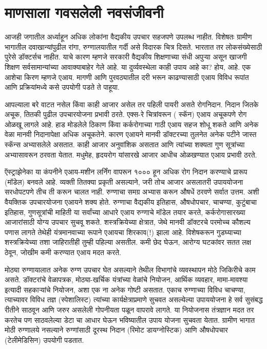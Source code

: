 \chapter{माणसाला गवसलेली नवसंजीवनी}

आजही जगातील अर्ध्याहून अधिक लोकांना वैद्यकीय उपचार सहजपणे उपलब्ध नाहीत. विशेषतः ग्रामीण भागातील दवाखान्यांपुढील रांगा, रुग्णालयातील गर्दी असे विदारक चित्र दिसते. भारतात तर लोकसंख्येसाठी पुरेसे डॉक्टर्सच नाहीत. याचे कारण म्हणजे सरकारी वैद्यकीय शिक्षणाच्या संधी अपुऱ्या असून खाजगी शिक्षण सर्वसामान्यांच्या आवाक्याबाहेर गेले आहे. या दुर्व्यवस्थेला काही उपाय आहे का? होय, आहे. एक आशेचा किरण म्हणजे एआय. मागणी आणि पुरवठ्यातील दरी भरून काढण्यासाठी एआय विविध रूपांत आणि प्रक्रियांमध्ये कसे उपयोगी पडते ते पाहूया.

आपल्याला बरे वाटत नसेल किंवा काही आजार असेल तर पहिली पायरी असते रोगनिदान. निदान जितके अचूक, तितकी पुढील उपचारयोजना प्रभावी ठरते. एक्स-रे चित्रांवरून ( स्कॅन) एआय अचूकपणे रोग ओळखू लागले आहे. हाड मोडलेले ठिकाण किंवा कर्करोगाच्या गाठी एआय सहज शोधू शकते आणि अनेक वेळा मानवी निदानापेक्षा अधिक अचूकतेने. कारण एआयने मानवी डॉक्टरच्या तुलनेत अनेक पटीने जास्त स्कॅन्स अभ्यासलेले असतात. काही आजार अनुवांशिक असतात आणि त्यांच्या शक्यता गुण सूत्रांच्या अभ्यासावरून ठरवता येतात.  मधुमेह, हृदयरोग यांसारखे आजार आधीच ओळखण्यात एआय प्रभावी ठरते. 

ऍस्ट्राझेनेका या कंपनीने एआय-मशीन लर्निंग वापरून १००० हून अधिक रोग निदान करण्याचे प्रारूप (मॉडेल) बनवले आहे. व्यक्ती तितक्या प्रकृती असल्याने, जरी तोच आजार असलातरी उपाययोजना सरधोपटपणे तीच ती करून चालत नाही. रुग्णाचा समग्र अभ्यास करून औषधें ठरवणे सर्वात उत्तम. अशी वैयक्तिक उपचारयोजना एआयने शक्य होते. रुग्णाचा वैद्यकीय इतिहास, औषधोपचार, चाचण्या, कुटुंबाचा इतिहास, गुणसूत्रांची माहिती या सर्वांच्या आधारे एआय रुग्णाचे मॉडेल तयार करते,  कर्करोगासारख्या आजारांसाठी योग्य उपचार सुचवू शकते.  शस्त्रक्रियेच्या क्षेत्रात, जेथे मानवी डॉक्टरचे परमोच्च कौशल्य पणास लागते तेथेही यंत्रमानवाच्या रूपाने एआयचा शिरकाव(!) झाला आहे. विशेषकरून गुडघ्याच्या शस्त्रक्रियेच्या तशा जाहिरातीही तुम्ही पहिल्या असतील. कमी छेद घेऊन, आरोग्य घटकांवर सतत लक्ष ठेवून, जोखीम कमी करण्यात एआय मदत करते.

मोठ्या रुग्णायालात अनेक रुग्ण उपचार घेत असल्याने तेथील विभागांचे व्यवस्थापन मोठे जिकिरीचे काम असते. डॉक्टरांचे वेळापत्रक, मोठ्या-खर्चिक यंत्रांच्या वेळांचे नियोजन, आर्थिक व्यवहार, मामा-मावश्या इत्यादी सहकाऱ्यांचे नियोजन, अशा एक ना अनेक गोष्टी असतात. एकाच रुग्णाच्या विविध चाचण्या, त्याच्यावर विविध तज्ञ (स्पेशालिस्ट) त्यांच्या कार्यक्षेत्राप्रमाणे सुचवत असल्येल्या उपाययोजना हे सर्व सुसंबद्ध रीतीने साठवून आणि जरुर असलेली गोपनीयता पळून वापरावे लागते. या नियोजनास तंत्रज्ञान मदत तर करतेच पण साठवलेल्या डेटा चा आधार घेऊन भविष्यातील उपाय योजना सुचवता येतात. ग्रामीण भागात मोठी रुग्णालये नसल्याने रुग्णांसाठी दूरस्थ निदान (रिमोट डायग्नोस्टिक) आणि औषधोपचार (टेलीमेडिसिन) उपयोगी पडतात. 

